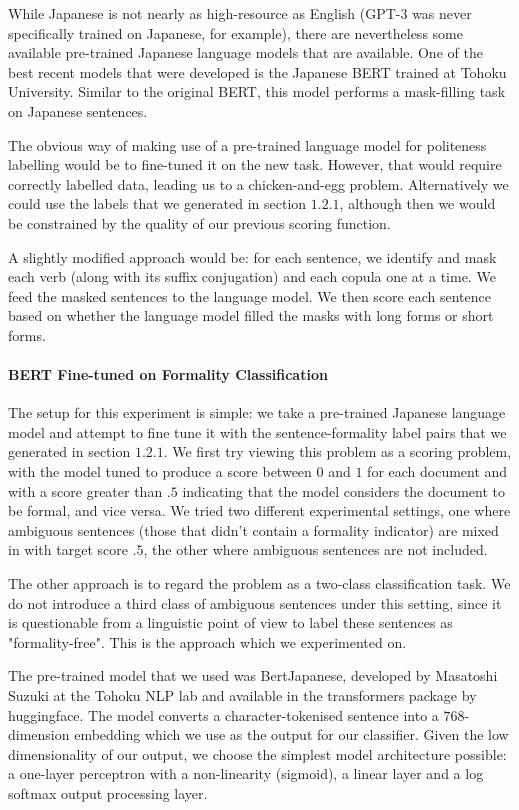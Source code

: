 \documentclass[11pt]{article}
\begin{document}
While Japanese is not nearly as high-resource as English (GPT-3 was never specifically trained on Japanese, for example), there are nevertheless some available pre-trained Japanese language models that are available. One of the best recent models that were developed is the Japanese BERT trained at Tohoku University. Similar to the original BERT, this model performs a mask-filling task on Japanese sentences. 

The obvious way of making use of a pre-trained language model for politeness labelling would be to fine-tuned it on the new task. However, that would require correctly labelled data, leading us to a chicken-and-egg problem. Alternatively we could use the labels that we generated in section $1.2.1$, although then we would be constrained by the quality of our previous scoring function.

A slightly modified approach would be: for each sentence, we identify and mask each verb (along with its suffix conjugation) and each copula one at a time. We feed the masked sentences to the language model. We then score each sentence based on whether the language model filled the masks with long forms or short forms.

\paragraph{BERT Fine-tuned on Formality Classification}

The setup for this experiment is simple: we take a pre-trained Japanese language model and attempt to fine tune it with the sentence-formality label pairs that we generated in section $1.2.1$. We first try viewing this problem as a scoring problem, with the model tuned to produce a score between $0$ and $1$ for each document and with a score greater than $.5$ indicating that the model considers the document to be formal, and vice versa. We tried two different experimental settings, one where ambiguous sentences (those that didn't contain a formality indicator) are mixed in with target score $.5$, the other where ambiguous sentences are not included.

The other approach is to regard the problem as a two-class classification task. We do not introduce a third class of ambiguous sentences under this setting, since it is questionable from a linguistic point of view to label these sentences as "formality-free". This is the approach which we experimented on.

The pre-trained model that we used was BertJapanese, developed by Masatoshi Suzuki at the Tohoku NLP lab and available in the transformers package by huggingface. The model converts a character-tokenised sentence into a $768$-dimension embedding which we use as the output for our classifier. Given the low dimensionality of our output, we choose the simplest model architecture possible: a one-layer perceptron with a non-linearity (sigmoid), a linear layer and a log softmax output processing layer.
\end{document}
